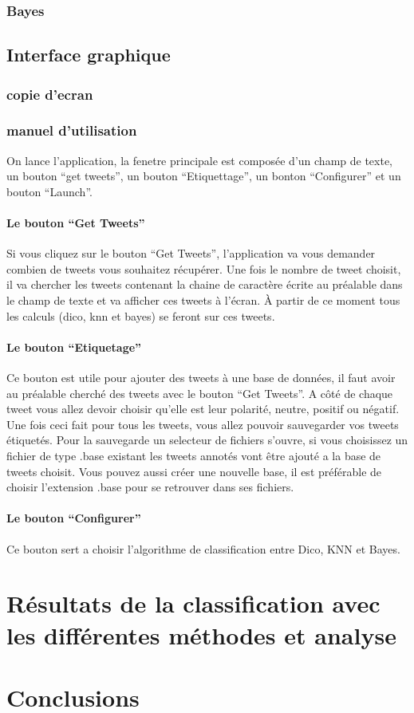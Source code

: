 \documentclass[a4paper,10pt]{report}
\begin{document}
    \subsection{Bayes}
  \section{Interface graphique}
    \subsection{copie d'ecran}
    \subsection{manuel d'utilisation}
      On lance l'application, la fenetre principale est composée d'un champ de texte, un bouton ``get tweets'', un bouton ``Etiquettage'', un bonton ``Configurer'' et 
      un bouton ``Launch''.
      \subsubsection{Le bouton ``Get Tweets''}
	Si vous cliquez sur le bouton ``Get Tweets'', l'application va vous demander combien de tweets vous souhaitez récupérer. Une fois le nombre de tweet choisit,
	il va chercher les tweets contenant la chaine de caractère écrite au préalable dans le champ de texte et va afficher ces tweets à l'écran.
	À partir de ce moment tous les calculs (dico, knn et bayes) se feront sur ces tweets.
      \subsubsection{Le bouton ``Etiquetage''}
	Ce bouton est utile pour ajouter des tweets à une base de données, il faut avoir au préalable cherché des tweets avec le bouton ``Get Tweets''.
	A côté de chaque tweet vous allez devoir choisir qu'elle est leur polarité, neutre, positif ou négatif. Une fois ceci fait pour tous les tweets, vous 
	allez pouvoir sauvegarder vos tweets étiquetés. Pour la sauvegarde un selecteur de fichiers s'ouvre, si vous choisissez un fichier de type .base existant
	les tweets annotés vont être ajouté a la base de tweets choisit. Vous pouvez aussi créer une nouvelle base, il est préférable de choisir l'extension .base
	pour se retrouver dans ses fichiers.
      \subsubsection{Le bouton ``Configurer''}
	Ce bouton sert a choisir l'algorithme de classification entre Dico, KNN et Bayes. 
\chapter{Résultats de la classification avec les différentes méthodes et analyse}
\chapter{Conclusions}
\end{document}
